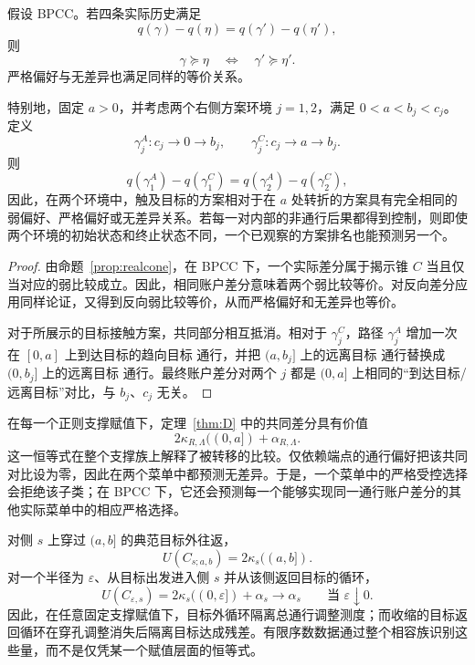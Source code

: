 \begin{theorem}[实际比较对差分不变性与方案转移]\label{thm:D}
假设 BPCC。若四条实际历史满足
\[
 q(\gamma)-q(\eta)=q(\gamma')-q(\eta'),
\]
则
\[
 \gamma\succeq\eta
 \quad\Longleftrightarrow\quad
 \gamma'\succeq\eta'.
\]
严格偏好与无差异也满足同样的等价关系。

特别地，固定 $a>0$，并考虑两个右侧方案环境 $j=1,2$，满足 $0<a<b_j<c_j$。定义
\[
 \gamma_j^A:c_j\to0\to b_j,
 \qquad
 \gamma_j^C:c_j\to a\to b_j.
\]
则
\[
 q(\gamma_1^A)-q(\gamma_1^C)
 =q(\gamma_2^A)-q(\gamma_2^C),
\]
因此，在两个环境中，触及目标的方案相对于在 $a$ 处转折的方案具有完全相同的弱偏好、严格偏好或无差异关系。若每一对内部的非通行后果都得到控制，则即使两个环境的初始状态和终止状态不同，一个已观察的方案排名也能预测另一个。
\end{theorem}

\begin{proof}
由命题~\ref{prop:realcone}，在 BPCC 下，一个实际差分属于揭示锥 $C$ 当且仅当对应的弱比较成立。因此，相同账户差分意味着两个弱比较等价。对反向差分应用同样论证，又得到反向弱比较等价，从而严格偏好和无差异也等价。

对于所展示的目标接触方案，共同部分相互抵消。相对于 $\gamma_j^C$，路径 $\gamma_j^A$ 增加一次在 $[0,a]$ 上到达目标的趋向目标 通行，并把 $(a,b_j]$ 上的远离目标 通行替换成 $(0,b_j]$ 上的远离目标 通行。最终账户差分对两个 $j$ 都是 $(0,a]$ 上相同的“到达目标/远离目标”对比，与 $b_j$、$c_j$ 无关。
\end{proof}

在每一个正则支撑赋值下，定理~\ref{thm:D} 中的共同差分具有价值
\[
 2\kappa_{R,\Lambda}((0,a])+\alpha_{R,\Lambda}.
\]
这一恒等式在整个支撑族上解释了被转移的比较。仅依赖端点的通行偏好把该共同对比设为零，因此在两个菜单中都预测无差异。于是，一个菜单中的严格受控选择会拒绝该子类；在 BPCC 下，它还会预测每一个能够实现同一通行账户差分的其他实际菜单中的相应严格选择。

\begin{corollary}[目标外循环与收缩的目标返回循环]\label{cor:loops}
对侧 $s$ 上穿过 $(a,b]$ 的典范目标外往返，
\[
 U(C_{s;a,b})=2\kappa_s((a,b]).
\]
对一个半径为 $\varepsilon$、从目标出发进入侧 $s$ 并从该侧返回目标的循环，
\[
 U(C_{\varepsilon,s})
  =2\kappa_s((0,\varepsilon])+\alpha_s
  \longrightarrow\alpha_s
 \qquad\text{当 }\varepsilon\downarrow0.
\]
因此，在任意固定支撑赋值下，目标外循环隔离总通行调整测度；而收缩的目标返回循环在穿孔调整消失后隔离目标达成残差。有限序数数据通过整个相容族识别这些量，而不是仅凭某一个赋值层面的恒等式。
\end{corollary}

